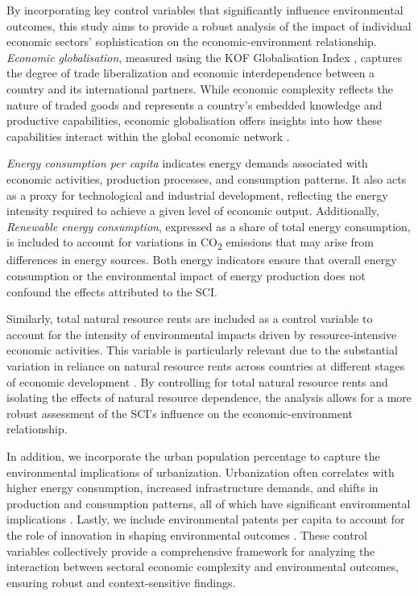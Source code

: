 \documentclass[10pt]{article}
\begin{document}
By incorporating key control variables that significantly influence environmental outcomes, this study aims to provide a robust analysis of the impact of individual economic sectors' sophistication on the economic-environment relationship. \textit{Economic globalisation}, measured using the KOF Globalisation Index \citep{KOFGlobalisationIndex}, captures the degree of trade liberalization and economic interdependence between a country and its international partners. While economic complexity reflects the nature of traded goods and represents a country's embedded knowledge and productive capabilities, economic globalisation offers insights into how these capabilities interact within the global economic network \citep{wangReinvestigatingEnvironmentalKuznets2024}.

\textit{Energy consumption per capita} indicates energy demands associated with economic activities, production processes, and consumption patterns. It also acts as a proxy for technological and industrial development, reflecting the energy intensity required to achieve a given level of economic output. Additionally, \textit{Renewable energy consumption}, expressed as a share of total energy consumption, is included to account for variations in CO\textsubscript{2} emissions that may arise from differences in energy sources. Both energy indicators ensure that overall energy consumption or the environmental impact of energy production does not confound the effects attributed to the SCI.

Similarly, total natural resource rents are included as a control variable to account for the intensity of environmental impacts driven by resource-intensive economic activities. This variable is particularly relevant due to the substantial variation in reliance on natural resource rents across countries at different stages of economic development \citep{alvaradoEcologicalFootprintEconomic2021}. By controlling for total natural resource rents and isolating the effects of natural resource dependence, the analysis allows for a more robust assessment of the SCI's influence on the economic-environment relationship.

In addition, we incorporate the urban population percentage to capture the environmental implications of urbanization. Urbanization often correlates with higher energy consumption, increased infrastructure demands, and shifts in production and consumption patterns, all of which have significant environmental implications \citep{liangEffectUrbanizationEnvironmental2019}. Lastly, we include environmental patents per capita to account for the role of innovation in shaping environmental outcomes \citep{choiLinksEnvironmentalInnovation2018}. These control variables collectively provide a comprehensive framework for analyzing the interaction between sectoral economic complexity and environmental outcomes, ensuring robust and context-sensitive findings.
\end{document}
